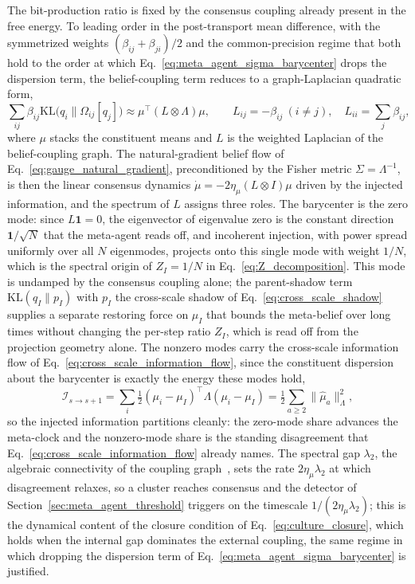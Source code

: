 The bit-production ratio is fixed by the consensus coupling already present in the free energy. To leading order in the post-transport mean difference, with the symmetrized weights $(\beta_{ij}+\beta_{ji})/2$ and the common-precision regime that both hold to the order at which Eq.~\eqref{eq:meta_agent_sigma_barycenter} drops the dispersion term, the belief-coupling term reduces to a graph-Laplacian quadratic form,
\begin{equation}
\sum_{ij}\beta_{ij}\mathrm{KL}\big(q_i \| \Omega_{ij}[q_j]\big) \approx \mu^\top (L \otimes \Lambda)\mu,
\qquad
L_{ij} = -\beta_{ij}\ (i\neq j),\quad L_{ii} = \sum_{j}\beta_{ij},
\label{eq:coupling_laplacian}
\end{equation}
where $\mu$ stacks the constituent means and $L$ is the weighted Laplacian of the belief-coupling graph. The natural-gradient belief flow of Eq.~\eqref{eq:gauge_natural_gradient}, preconditioned by the Fisher metric $\Sigma = \Lambda^{-1}$, is then the linear consensus dynamics $\dot\mu = -2\eta_\mu (L\otimes I)\mu$ driven by the injected information, and the spectrum of $L$ assigns three roles. The barycenter is the zero mode: since $L\mathbf{1} = 0$, the eigenvector of eigenvalue zero is the constant direction $\mathbf{1}/\sqrt{N}$ that the meta-agent reads off, and incoherent injection, with power spread uniformly over all $N$ eigenmodes, projects onto this single mode with weight $1/N$, which is the spectral origin of $Z_I = 1/N$ in Eq.~\eqref{eq:Z_decomposition}. This mode is undamped by the consensus coupling alone; the parent-shadow term $\mathrm{KL}(q_I \| p_I)$ with $p_I$ the cross-scale shadow of Eq.~\eqref{eq:cross_scale_shadow} supplies a separate restoring force on $\mu_I$ that bounds the meta-belief over long times without changing the per-step ratio $Z_I$, which is read off from the projection geometry alone. The nonzero modes carry the cross-scale information flow of Eq.~\eqref{eq:cross_scale_information_flow}, since the constituent dispersion about the barycenter is exactly the energy these modes hold,
\begin{equation}
\mathcal{I}_{s\to s+1} = \sum_{i} \tfrac{1}{2}(\mu_i - \mu_I)^\top \Lambda (\mu_i - \mu_I) = \tfrac{1}{2}\sum_{a\ge 2}\|\hat\mu_a\|_\Lambda^2,
\label{eq:Ilow_eq_dispersion}
\end{equation}
so the injected information partitions cleanly: the zero-mode share advances the meta-clock and the nonzero-mode share is the standing disagreement that Eq.~\eqref{eq:cross_scale_information_flow} already names. The spectral gap $\lambda_2$, the algebraic connectivity of the coupling graph~\cite{Fiedler1973}, sets the rate $2\eta_\mu\lambda_2$ at which disagreement relaxes, so a cluster reaches consensus and the detector of Section~\ref{sec:meta_agent_threshold} triggers on the timescale $1/(2\eta_\mu\lambda_2)$; this is the dynamical content of the closure condition of Eq.~\eqref{eq:culture_closure}, which holds when the internal gap dominates the external coupling, the same regime in which dropping the dispersion term of Eq.~\eqref{eq:meta_agent_sigma_barycenter} is justified.

